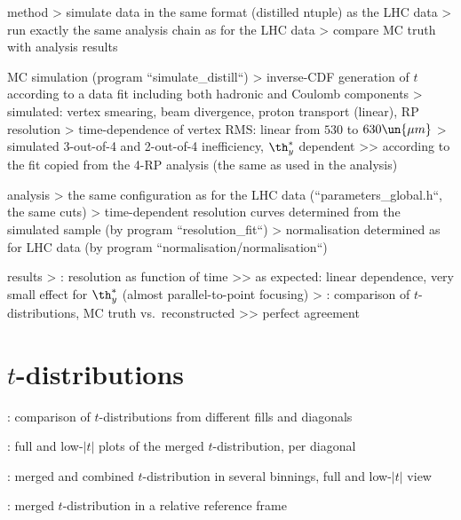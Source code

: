 \> method
\>> simulate data in the same format (distilled ntuple) as the LHC data
\>> run exactly the same analysis chain as for the LHC data
\>> compare MC truth with analysis results

\> MC simulation (program ``simulate\_distill``)
\>> inverse-CDF generation of $t$ according to a data fit including both hadronic and Coulomb components
\>> simulated: vertex smearing, beam divergence, proton transport (linear), RP resolution
\>> time-dependence of vertex RMS: linear from $530$ to $630\un{\mu m}$
\>> simulated 3-out-of-4 and 2-out-of-4 inefficiency, $\th^*_y$ dependent
\>>> according to the fit copied from the 4-RP analysis (the same as used in the analysis)

\> analysis
\>> the same configuration as for the LHC data (``parameters\_global.h``, the same cuts)
\>> time-dependent resolution curves determined from the simulated sample (by program ``resolution\_fit``)
\>> normalisation determined as for LHC data (by program ``normalisation/normalisation``)

\> results
\>>  : resolution as function of time
\>>> as expected: linear dependence, very small effect for $\th_y^*$ (almost parallel-to-point focusing)
\>>  : comparison of $t$-distributions, MC truth vs.\ reconstructed
\>>> perfect agreement



\chapter[t-distributions]{$t$-distributions}

\>  : comparison of $t$-distributions from different fills and diagonals

\>  : full and low-$|t|$ plots of the merged $t$-distribution, per diagonal

\>  : merged and combined $t$-distribution in several binnings, full and low-$|t|$ view

\>  : merged $t$-distribution in a relative reference frame



